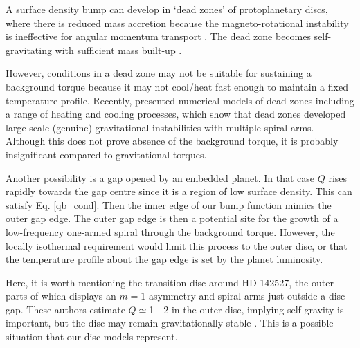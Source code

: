   A surface density bump can develop in 
  `dead zones' of protoplanetary 
  discs, where there is reduced mass accretion because the magneto-rotational 
  instability is ineffective for angular momentum transport 
  \citep{gammie96,turner08,landry13}. The dead zone becomes 
  self-gravitating with sufficient mass built-up 
  \citep{armitage01,martin12,martin12b,zhu09,zhu10,zhu10b,bae13}.  
  
  However, conditions in a dead zone may not be suitable for 
  sustaining a background torque because it may not cool/heat fast enough
  to maintain a fixed temperature profile. Recently, 
  \cite{bae14} presented numerical models of
  dead zones including a range of heating and 
  cooling processes, which show that dead zones developed large-scale
  (genuine) gravitational instabilities with multiple spiral
  arms. Although this does not prove absence of the background torque,
  it is probably insignificant compared to gravitational torques. 

  Another possibility is a gap opened by an embedded planet. In that case $Q$
  rises rapidly towards the gap centre since it is a region of low
  surface density. This can satisfy Eq. \ref{qb_cond}. Then the inner
  edge of our bump function mimics the outer gap edge. The outer gap
  edge is then a potential site for the growth of a low-frequency
  one-armed spiral through the background torque. However, the
  locally isothermal requirement would limit this process to the
  outer disc, or that the temperature 
  profile about the gap edge is set by the planet luminosity.  

  Here, it is worth mentioning the transition disc 
  around HD 142527, the outer parts of which displays an $m=1$
  asymmetry \citep{fukagawa13} and spiral arms 
  \citep{christiaens14} just outside a disc gap. These authors estimate 
  $Q\simeq$1---2 in the outer disc, implying self-gravity is
  important, but the disc may remain gravitationally-stable
  \citep{christiaens14}. This is a  
  possible situation that our disc models represent. 


